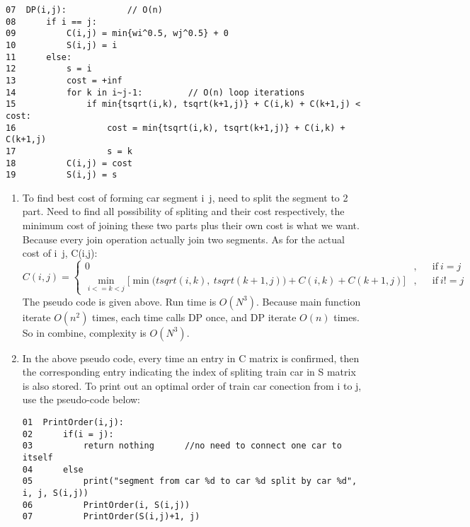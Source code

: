 \documentclass{article}
\begin{document}
\begin{enumerate}
\begin{verbatim}
07  DP(i,j):			// O(n)
08      if i == j:
09          C(i,j) = min{wi^0.5, wj^0.5} + 0
10          S(i,j) = i
11      else:
12          s = i
13          cost = +inf
14          for k in i~j-1:			// O(n) loop iterations
15              if min{tsqrt(i,k), tsqrt(k+1,j)} + C(i,k) + C(k+1,j) < cost:
16                  cost = min{tsqrt(i,k), tsqrt(k+1,j)} + C(i,k) + C(k+1,j)
17                  s = k
18          C(i,j) = cost
19          S(i,j) = s
\end{verbatim}
    \begin{enumerate}
        \item 
        To find best cost of forming car segment i~j, need to split the segment to 2 part. Need to find all possibility of spliting and their cost respectively, the minimum cost of joining these two parts plus their own cost is what we want. Because every join operation actually join two segments.
        As for the actual cost of i~j, C(i,j):\newline
        \[
            C(i,j) = \left \{
            \begin{aligned}
              0&, && \text{if}\ i=j \\
              \min_{i <= k < j}\big[ \min\big(tsqrt(i,k),\ tsqrt(k+1,j)\big) + C(i,k) + C(k+1,j) \big]&, && \text{if}\ i!=j
            \end{aligned} \right.
        \]
        The pseudo code is given above.\newline
        Run time is $O(N^3)$. Because main function iterate $O(n^2)$ times, each time calls DP once, and DP iterate $O(n)$ times. So in combine, complexity is $O(N^3)$.
        \item 
        In the above pseudo code, every time an entry in C matrix is confirmed, then the corresponding entry indicating the index of spliting train car in S matrix is also stored. To print out an optimal order of train car conection from i to j, use the pseudo-code below:
        \begin{verbatim}
01  PrintOrder(i,j):
02      if(i = j):
03	        return nothing	    //no need to connect one car to itself
04      else
05        	print("segment from car %d to car %d split by car %d", i, j, S(i,j))
06    	    PrintOrder(i, S(i,j))
07    	    PrintOrder(S(i,j)+1, j)
        \end{verbatim}
    \end{enumerate}
\end{enumerate}
\end{document}
